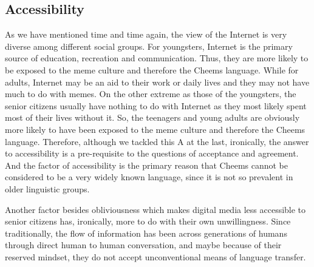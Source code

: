 \def\DevnagVersion{2.17}\documentclass{article}
\begin{document}
\subsection{Accessibility}
As we have mentioned time and time again, the view of the Internet is very diverse among different social groups. For youngsters, Internet is the primary source of education, recreation and communication. Thus, they are more likely to be exposed to the meme culture and therefore the Cheems language. While for adults, Internet may be an aid to their work or daily lives and they may not have much to do with memes. On the other extreme as those of the youngsters, the senior citizens usually have nothing to do with Internet as they most likely spent most of their lives without it. So, the teenagers and young adults are obviously more likely to have been exposed to the meme culture and therefore the Cheems language. Therefore, although we tackled this A at the last, ironically, the answer to accessibility is a pre-requisite to the questions of acceptance and agreement. And the factor of accessibility is the primary reason that Cheems cannot be considered to be a very widely known language, since it is not so prevalent in older linguistic groups. \par
Another factor besides obliviousness which makes digital media less accessible to senior citizens has, ironically, more to do with their own unwillingness. Since traditionally, the flow of information has been across generations of humans through direct human to human conversation, and maybe because of their reserved mindset, they do not accept unconventional means of language transfer.
\end{document}
